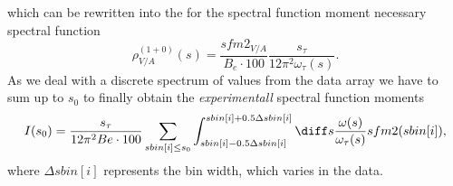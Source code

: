 which can be rewritten into the for the spectral function moment necessary spectral function
\begin{equation}
	\rho_{V/A}^{(1+0)}(s) = \frac{sfm2_{V/A}}{B_e \cdot 100} \frac{s_\tau}{12 \pi^2 \omega_\tau(s)}.
\end{equation}
As we deal with a discrete spectrum of values from the data array we have to sum up to $s_0$ to finally obtain the \textit{experimentall} spectral function moments
\begin{equation}
	I(s_0) = \frac{s_\tau}{12 \pi^2 Be \cdot 100} \sum_{sbin[i] \leq s_0} \int_{sbin[i]- 0.5 \Delta sbin[i]}^{sbin[i] + 0.5 \Delta sbin[i]} \diff s \frac{\omega(s)}{\omega_\tau(s)} sfm2(sbin[i]),
\end{equation}
where $\Delta sbin[i]$ represents the bin width, which varies in the data. 
	
	
	
	
